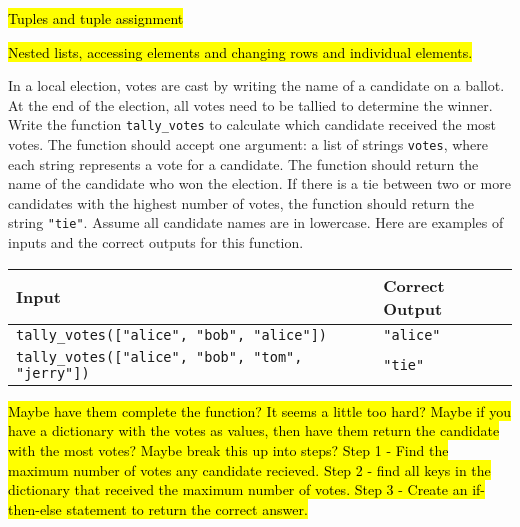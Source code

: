 \documentclass[12pt]{exam}
\begin{document}
\begin{questions}


\question \hl{Tuples and tuple assignment}

\question \hl{Nested lists, accessing elements and changing rows and individual elements. }

\question In a local election, votes are cast by writing the name of a candidate on a ballot. At the end of the election, all votes need to be tallied to determine the winner. Write the function \verb|tally_votes| to calculate which
candidate received the most votes. The function should accept one argument: a list of strings \verb|votes|, where
each string represents a vote for a candidate. The function should return the name of the candidate who
won the election. If there is a tie between two or more candidates with the highest number of votes, the
function should return the string \verb|"tie"|. Assume all candidate names are in lowercase.  Here are examples of inputs and the correct outputs for this function.

\begin{tabular}{|l|l|}
\hline
\textbf{Input} & \textbf{Correct Output} \\ \hline
\verb|tally_votes(["alice", "bob", "alice"])| & \verb|"alice"| \hspace*{1in} \\ \hline
\verb|tally_votes(["alice", "bob", "tom", "jerry"])| & \verb|"tie"| \hspace*{1in} \\ \hline
\end{tabular}

\hl{Maybe have them complete the function? It seems a little too hard? Maybe if you have a dictionary with the votes as values, then have them return the candidate with the most votes?  Maybe break this up into steps?  Step 1 - Find the maximum number of votes any candidate recieved.  Step 2 - find all keys in the dictionary that received the maximum number of votes.  Step 3 - Create an if-then-else statement to return the correct answer.}


\end{questions}
\end{document}
